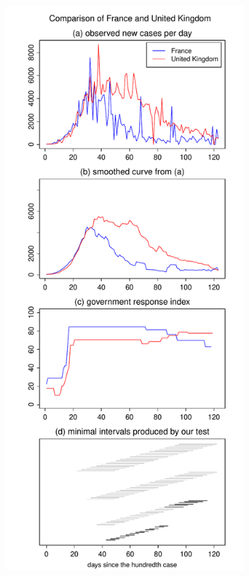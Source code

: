 \documentclass[a4paper,12pt]{article}
\numberwithin{equation}{section}
\begin{document}
\begin{figure}[t!]
\begin{subfigure}[b]{0.475\textwidth}
\end{subfigure}\hspace{0.55cm}
\begin{subfigure}[b]{0.475\textwidth}
\includegraphics[width=\textwidth]{plots/FRA_vs_GBR}
\end{subfigure}
\vspace{0.25cm}


\end{figure}
\end{document}
